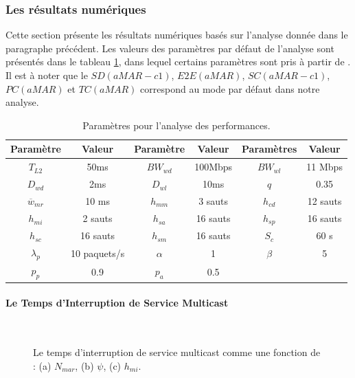 \normalsize
\subsubsection{Les résultats numériques}
Cette section présente les résultats numériques basés sur l'analyse donnée dans le paragraphe précédent. Les valeurs des paramètres par défaut de l'analyse sont présentés dans le tableau \ref{tap:c10_parameters}, dans lequel certains paramètres sont pris à partir de \cite{dsrm, d4.4}. Il est à noter que le $ SD (aMAR-c1) $, $ E2E (aMAR) $, $ SC (aMAR-c1) $, $ PC (aMAR) $ et $ TC (aMAR) $ correspond au mode par défaut dans notre analyse. \\

\begin{table}[ht]
\small
\caption{Paramètres pour l'analyse des performances.}
\label{tap:c10_parameters}
\centering
\begin{tabular}{|c |c |c |c |c |c |}%
\hline
\textbf{Paramètre} & \textbf{Valeur} & \textbf{Paramètre} & \textbf{Valeur} & \textbf{Paramètres} & \textbf{Valeur}  \\
\hline
$T_{L2}$ & 50ms & $BW_{wd}$  &  100Mbps & $BW_{wl}$  & 11 Mbps\\
\hline
  $D_{wd}$& 2ms  & $D_{wl}$ & 10ms & $q$& 0.35  \\
\hline
$\overline{w}_{mr}$&  10 ms  & $h_{mm}$ & 3 sauts & $h_{cd}$&  12 sauts  \\
\hline
$h_{mi}$& 2 sauts  & $h_{sa}$& 16 sauts  & $h_{sp}$&  16 sauts   \\
\hline
 $h_{sc}$  & 16 sauts   & $h_{sm}$&  16 sauts &$S_{c} $&  60 s  \\
\hline
$\lambda_{p}$& 10 paquets/s  & $\alpha$&  1 & $\beta $&  5  \\
\hline
$p_{p}$& 0.9  & $p_{a}$&  0.5 & & \\
\hline
\end{tabular}
\end{table}
\normalsize

\paragraph{Le Temps d'Interruption de Service Multicast}
\begin{figure}[!h]
\centering
{}
\,
\caption[Le temps d'interruption de service multicast.]{Le temps d'interruption de service multicast comme une fonction de : (a) $N_{mar}$, (b) $\psi$, (c) $h_{mi}$.} 
\label{fig:c10_sd}
\end{figure}

